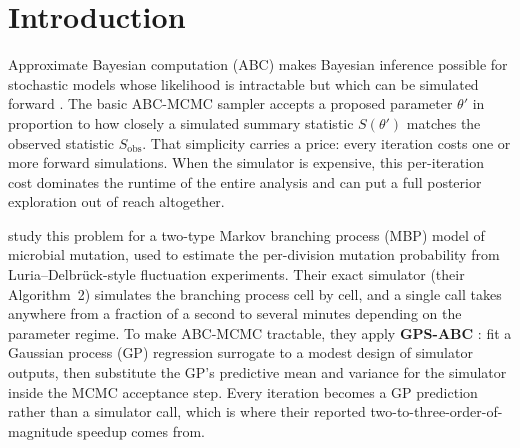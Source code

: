 \documentclass[sn-basic,iicol,pdflatex]{sn-jnl}
\begin{document}

\maketitle

\section{Introduction}
\label{sec:intro}

Approximate Bayesian computation (ABC) makes Bayesian inference possible for
stochastic models whose likelihood is intractable but which can be simulated
forward \citep{beaumont2002,marjoram2003,marin2012}. The basic ABC-MCMC sampler
\citep{marjoram2003} accepts a proposed parameter $\theta'$ in proportion to how
closely a simulated summary statistic $S(\theta')$ matches the observed
statistic $S_{\mathrm{obs}}$. That simplicity carries a price: every iteration
costs one or more forward simulations. When the simulator is expensive, this
per-iteration cost dominates the runtime of the entire analysis and can put a
full posterior exploration out of reach altogether.

\citet{lu2023} study this problem for a two-type Markov branching process (MBP)
model of microbial mutation, used to estimate the per-division mutation
probability from Luria--Delbr\"uck-style fluctuation experiments. Their exact
simulator (their Algorithm~2) simulates the branching process cell by cell, and
a single call takes anywhere from a fraction of a second to several minutes
depending on the parameter regime. To make ABC-MCMC tractable, they apply
\textbf{GPS-ABC} \citep{meeds2014}: fit a Gaussian process (GP) regression
surrogate to a modest design of simulator outputs, then substitute the GP's
predictive mean and variance for the simulator inside the MCMC acceptance
step. Every iteration becomes a GP prediction rather than a simulator call,
which is where their reported two-to-three-order-of-magnitude speedup comes
from.
\end{document}
